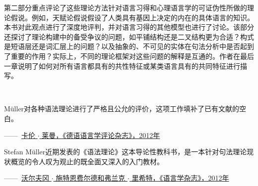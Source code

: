 {第二部分重点评论了这些理论方法针对语言习得和心理语言学的可证伪性所做的理论假说。例如，天赋论假说假设了人类具有基因上决定的内在的具体语言的知识。本书对此观点进行了深度地评判，并对语言习得的其他模型也进行了讨论。该部分还探讨了理论构建中的备受争议的问题，如平铺结构还是二叉结构更为合适？构式是短语层还是词汇层上的问题？以及抽象的、不可见的实体在句法分析中是否起到了重要的作用？实际上，不同的理论框架对这些问题的解释是互通的。作者在最后一章说明了如何对所有语言都具有的共性特征或某类语言具有的共同特征进行描写。

\bigskip


~\bigskip

\noindent
Müller对各种语法理论进行了严格且公允的评价，这项工作填补了已有文献的空白。
\begin{flushright}
——\, \href{http://dx.doi.org/10.1515/zrs-2012-0040}{卡伦 $\cdot$ 莱曼，《德语语言学评论杂志》，2012年}
\end{flushright}


\smallskip

\noindent
Stefan Müller近期发表的《语法理论》这本导论性教科书，是一本针对句法理论现状概览的令人叹为观止的既全面又深入的入门教材。
 \begin{flushright}
——\, \href{http://dx.doi.org/10.1515/zfs-2012-0010}{沃尔夫冈 $\cdot$ 施特恩费尔德和弗兰克 $\cdot$ 里希特，《语言学杂志》，2012年}
\end{flushright}


}
